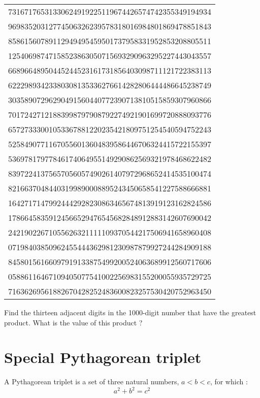\begin{center}
    \begin{tabular}{c}
        73167176531330624919225119674426574742355349194934\\
        96983520312774506326239578318016984801869478851843\\
        85861560789112949495459501737958331952853208805511\\
        12540698747158523863050715693290963295227443043557\\
        66896648950445244523161731856403098711121722383113\\
        62229893423380308135336276614282806444486645238749\\
        30358907296290491560440772390713810515859307960866\\
        70172427121883998797908792274921901699720888093776\\
        65727333001053367881220235421809751254540594752243\\
        52584907711670556013604839586446706324415722155397\\
        53697817977846174064955149290862569321978468622482\\
        83972241375657056057490261407972968652414535100474\\
        82166370484403199890008895243450658541227588666881\\
        16427171479924442928230863465674813919123162824586\\
        17866458359124566529476545682848912883142607690042\\
        24219022671055626321111109370544217506941658960408\\
        07198403850962455444362981230987879927244284909188\\
        84580156166097919133875499200524063689912560717606\\
        05886116467109405077541002256983155200055935729725\\
        71636269561882670428252483600823257530420752963450\\
    \end{tabular}
\end{center}

Find the thirteen adjacent digits in the 1000-digit number that have the greatest product. What is the value of this product ?


\section{Special Pythagorean triplet} \label{pb.009}
A Pythagorean triplet is a set of three natural numbers, $a < b < c$, for which :
$$a^2 + b^2 = c^2$$

